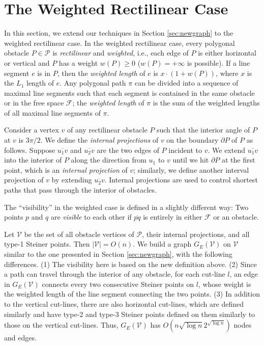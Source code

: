 \documentclass[english,runningheads,11pt]{llncs}
\def\calP{\mathcal{P}}
\def\calF{\mathcal{F}}
\def\calV{\mathcal{V}}
\begin{document}
\section{The Weighted Rectilinear Case}
\label{sec:weighted}

In this section, we extend our techniques in Section
\ref{sec:newgraph} to the weighted rectilinear case. In the
weighted rectilinear case, every polygonal obstacle $P\in \calP$ is
{\it rectilinear} and {\it weighted}, i.e., each edge of $P$ is
either horizontal or vertical and $P$ has a weight
$w(P)\geq 0$ ($w(P)=+\infty$ is possible). If a line segment $e$ is in $P$,
then the {\em weighted length} of $e$ is $x\cdot (1+w(P))$, where $x$ is the $L_1$ length of
$e$. Any polygonal path $\pi$ can be divided into a sequence of maximal
line segments such that each segment is contained in the same obstacle
or in the free space $\calF$; the {\em weighted length} of $\pi$ is the
sum of the weighted lengths of all maximal line segments of $\pi$.


Consider a vertex $v$ of any rectilinear obstacle $P$ such that the interior angle
of $P$ at $v$ is $3\pi/2$. We define the {\em
internal projections} of $v$ on the boundary $\partial P$ of $P$ as follows.
Suppose $\overline{u_1v}$ and $\overline{u_2v}$ are the two edges of
$P$ incident to $v$. We extend $\overline{u_1v}$ into the interior of
$P$ along the direction from $u_1$ to $v$ until we hit $\partial P$
at the first point, which is an {\em internal projection} of $v$; similarly,
we define another interval projection of $v$  by extending
$\overline{u_2v}$. Internal projections are used to control shortest
paths that pass through the interior of obstacles.

The ``visibility'' in the weighted case is defined in a slightly
different way: Two points $p$ and $q$ are {\em visible} to each other
if $\overline{pq}$ is entirely in either $\calF$ or an obstacle.


Let $\mathcal{V}$ be the set of all obstacle vertices of $\calP$, their internal
projections, and all type-1 Steiner points. Then $|\calV|=O(n)$.
We build a graph $G_E(\calV)$ on $\calV$ similar to the one presented in
Section \ref{sec:newgraph}, with the following differences.
(1) The visibility here is based on the new definition above.
(2) Since a path can travel through
the interior of any obstacle, for each cut-line $l$, an edge
in $G_E(\calV)$ connects every two consecutive Steiner points on
$l$, whose weight is the weighted length of the line segment
connecting the two points.
(3) In addition to the vertical
cut-lines, there are also horizontal cut-lines, which are defined
similarly and have type-2 and type-3 Steiner points defined on them similarly
to those on the vertical cut-lines.
Thus, $G_E(\calV)$ has $O(n\sqrt{\log n}2^{\sqrt{\log n}})$ nodes and edges.
\end{document}

